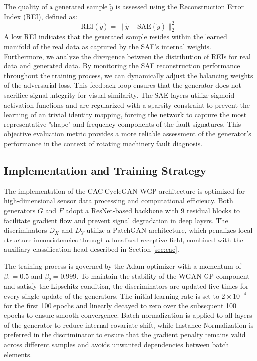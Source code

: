 \documentclass[twocolumn]{IEEEtran}
\begin{document}
The quality of a generated sample $\tilde{y}$ is assessed using the Reconstruction Error Index (REI), defined as:
\begin{equation}
\text{REI}(\tilde{y}) = \| \tilde{y} - \text{SAE}(\tilde{y}) \|_2^2
\label{eq:rei}
\tag{9}
\end{equation}
A low REI indicates that the generated sample resides within the learned manifold of the real data as captured by the SAE's internal weights. Furthermore, we analyze the divergence between the distribution of REIs for real data and generated data. By monitoring the SAE reconstruction performance throughout the training process, we can dynamically adjust the balancing weights of the adversarial loss. This feedback loop ensures that the generator does not sacrifice signal integrity for visual similarity. The SAE layers utilize sigmoid activation functions and are regularized with a sparsity constraint to prevent the learning of an trivial identity mapping, forcing the network to capture the most representative "shape" and frequency components of the fault signatures. This objective evaluation metric provides a more reliable assessment of the generator's performance in the context of rotating machinery fault diagnosis.

\subsection{Implementation and Training Strategy}
\label{sec:implementation}

The implementation of the CAC-CycleGAN-WGP architecture is optimized for high-dimensional sensor data processing and computational efficiency. Both generators $G$ and $F$ adopt a ResNet-based backbone with 9 residual blocks to facilitate gradient flow and prevent signal degradation in deep layers. The discriminators $D_X$ and $D_Y$ utilize a PatchGAN architecture, which penalizes local structure inconsistencies through a localized receptive field, combined with the auxiliary classification head described in Section \ref{sec:cac}.

The training process is governed by the Adam optimizer \cite{Kingma2015} with a momentum of $\beta_1 = 0.5$ and $\beta_2 = 0.999$. To maintain the stability of the WGAN-GP component and satisfy the Lipschitz condition, the discriminators are updated five times for every single update of the generators. The initial learning rate is set to $2 \times 10^{-4}$ for the first 100 epochs and linearly decayed to zero over the subsequent 100 epochs to ensure smooth convergence. Batch normalization is applied to all layers of the generator to reduce internal covariate shift, while Instance Normalization is preferred in the discriminator to ensure that the gradient penalty remains valid across different samples and avoids unwanted dependencies between batch elements.
\end{document}
